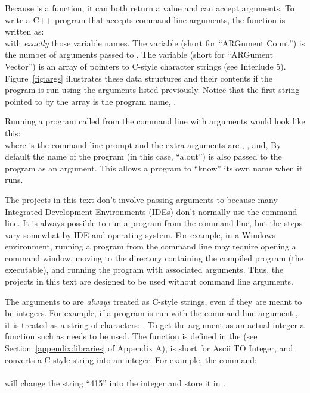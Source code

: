 Because  is a function, it can both return a value and can accept arguments.  To write a C++ program that accepts command-line arguments, the  function is written as:\\
with \emph{exactly} those variable names.  The variable  (short for ``ARGument Count'') is the number of arguments passed to .  The variable  (short for ``ARGument Vector'') is an array of pointers to C-style character strings (see Interlude 5).   Figure~\ref{fig:args} illustrates these data structures and their contents if the program is run using the arguments listed previously.  Notice that the first string pointed to by the  array is the program name, .

Running a program called  from the command line with arguments would look like this:\\
where \codefont{>} is the command-line prompt and the extra arguments are , , and,   By default the name of the program (in this case, ``a.out'') is also passed to the program as an argument.  This allows a program to ``know'' its own name when it runs.

The projects in this text don't involve passing arguments to  because many Integrated Development Environments (IDEs) don't normally use the command line.  It is always possible to run a program from the command line, but the steps vary somewhat by IDE and operating system.  For example, in a Windows environment, running a program from the command line may require opening  a command window, moving to the directory containing the compiled program (the executable), and running the program with associated arguments.  Thus, the projects in this text are designed to be used without command line arguments.

The arguments to  are \emph{always} treated as C-style strings, even if they are meant to be integers.  For example, if a program is run with the command-line argument , it is treated as a string of characters: .  To get the argument as an actual integer a function such as  needs to be used.  The function  is defined in the  (see Section~\ref{appendix:libraries} of Appendix A), is short for Ascii TO Integer, and converts a C-style string into an integer.  For example, the command:\\
\\
will change the string ``415'' into the integer  and store it in .


